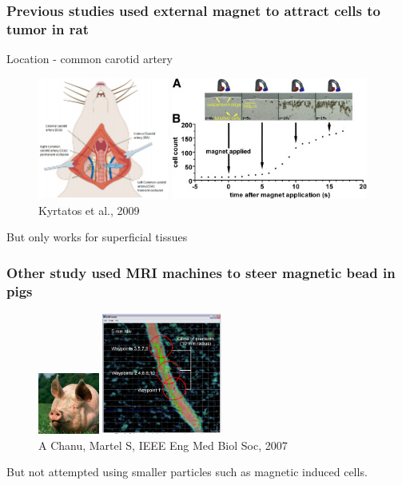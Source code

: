 \documentclass[8pt,xcolor=table]{beamer}
\begin{document}
\begin{frame}
\frametitle{Previous studies used external magnet to attract cells to tumor in rat}


Location - common carotid artery

\begin{figure}
\centering
\includegraphics[height=4cm]{rat_cca} \includegraphics[height=4cm]{external_magnet}\\
Kyrtatos  et al., 2009
\end{figure}

\vfill

But only works for superficial tissues
 
\end{frame}

\begin{frame}
\frametitle{Other study used MRI machines to steer magnetic bead in pigs}

\begin{figure}
\centering
\includegraphics[height=2cm]{pig} \includegraphics[height=4cm]{pig_tube}\\
A Chanu, Martel S, IEEE Eng Med Biol Soc, 2007
\end{figure}

\vfill

But not attempted using smaller particles such as magnetic induced cells.
 
\end{frame}
\end{document}
